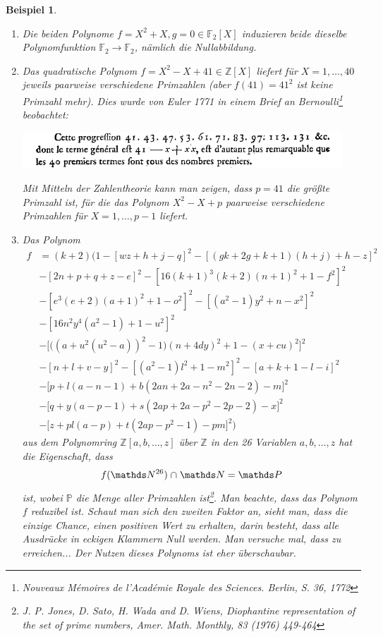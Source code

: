 \documentclass[a4paper, twoside, 11pt, ngerman]{report}
\newcommand{\FF}{\mathds F}
\newcommand{\NN}{\mathds N}
\newcommand{\PP}{\mathds P}
\newcommand{\ZZ}{\mathds Z}
\renewcommand{\cap}{\;\rotatebox{90}{\reflectbox{\rotatebox{270}{$\cup$}}}\;}
\theoremstyle{definistyle}
\newtheorem{bsp}[satz]{Beispiel}
\theoremstyle{remark}
\begin{document}
\begin{bsp}
\begin{enumerate}[label=(\alph*)]
\item Die beiden Polynome $f=X^2+X,g=0\in\FF_2[X]$ induzieren beide dieselbe Polynomfunktion $\FF_2\to\FF_2$, nämlich die Nullabbildung.
\item Das quadratische Polynom $f=X^2-X+41\in\ZZ[X]$ liefert für $X=1,\ldots,40$ jeweils paarweise verschiedene Primzahlen (aber $f(41)=41^2$ ist keine Primzahl mehr). Dies wurde von Euler 1771 in einem Brief an Bernoulli\footnote{Nouveaux M\'emoires de l’Acad\'emie Royale des Sciences. Berlin, S. 36, 1772} beobachtet:
\begin{center}
\includegraphics[width=12cm]{images/Euler_Prime.png}
\end{center}
Mit Mitteln der Zahlentheorie kann man zeigen, dass 
$p=41$ die größte Primzahl ist, für die das Polynom $X^2-X+p$ paarweise verschiedene Primzahlen für $X=1,\ldots,p-1$ liefert.
\item Das Polynom
\begin{align*}
f &= (k + 2) \bigg( 1  - [wz + h + j - q]^2  - [(gk + 2g + k + 1)(h + j) + h - z]^2 \\
& - [2n + p + q + z - e]^2  - [16(k + 1)^3(k + 2)(n + 1)^2 + 1 - f^2]^2 \\
&- [e^3(e + 2)(a + 1)^2 + 1 - o^2]^2 - [(a^2 - 1)y^2 + n - x^2]^2 \\
& - [16n^2y^4(a^2 - 1) + 1 - u^2]^2 \\
& - \bigg[ \bigg( (a + u^2(u^2 - a))^2 - 1 \bigg) (n + 4dy)^2 + 1 - (x + cu)^2 \bigg]^2 \\
& - [n + l + v - y]^2 - [(a^2 - 1)l^2 + 1 - m^2]^2  - [a + k + 1 - l - i]^2 \\
& - \bigg[ p + l(a - n - 1) + b (2an + 2a - n^2 - 2n - 2) - m \bigg]^2 \\
& - \bigg[ q + y(a - p - 1) + s (2ap + 2a - p^2 - 2p - 2) - x \bigg]^2 \\
& - \bigg[ z + pl(a - p) + t (2ap - p^2 - 1) - pm \bigg]^2 \bigg)
\end{align*}
aus dem Polynomring $\ZZ[a,b,\ldots,z]$ über $\ZZ$ in den 26 Variablen $a,b,\ldots,z$
hat die Eigenschaft, dass
\[
f(\NN^{26})\cap\NN=\PP
\]
ist, wobei $\PP$ die Menge aller Primzahlen ist\footnote{J. P. Jones, D. Sato, H. Wada and D. Wiens, Diophantine representation of the set of prime numbers, Amer. Math. Monthly, 83 (1976) 449-464}. Man beachte, dass das Polynom $f$ reduzibel ist. Schaut man sich den zweiten Faktor an, sieht man, dass die einzige Chance, einen positiven Wert zu erhalten,
darin besteht, dass alle Ausdrücke in eckigen Klammern Null werden. Man versuche mal, dass zu erreichen...
Der Nutzen dieses Polynoms ist eher überschaubar.
\end{enumerate}    
\end{bsp}
\end{document}
